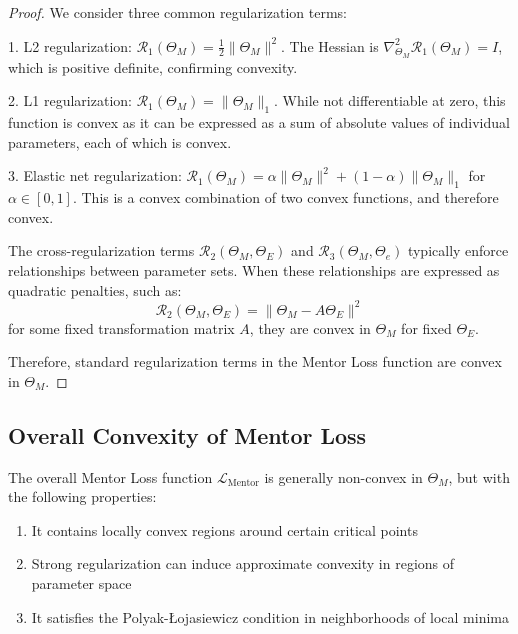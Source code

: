 \begin{proof}
We consider three common regularization terms:

1. L2 regularization: $\mathcal{R}_1(\Theta_M) = \frac{1}{2}\|\Theta_M\|^2$. The Hessian is $\nabla^2_{\Theta_M} \mathcal{R}_1(\Theta_M) = I$, which is positive definite, confirming convexity.

2. L1 regularization: $\mathcal{R}_1(\Theta_M) = \|\Theta_M\|_1$. While not differentiable at zero, this function is convex as it can be expressed as a sum of absolute values of individual parameters, each of which is convex.

3. Elastic net regularization: $\mathcal{R}_1(\Theta_M) = \alpha\|\Theta_M\|^2 + (1-\alpha)\|\Theta_M\|_1$ for $\alpha \in [0, 1]$. This is a convex combination of two convex functions, and therefore convex.

The cross-regularization terms $\mathcal{R}_2(\Theta_M, \Theta_E)$ and $\mathcal{R}_3(\Theta_M, \Theta_e)$ typically enforce relationships between parameter sets. When these relationships are expressed as quadratic penalties, such as:
\begin{equation}
\mathcal{R}_2(\Theta_M, \Theta_E) = \|\Theta_M - A\Theta_E\|^2
\end{equation}
for some fixed transformation matrix $A$, they are convex in $\Theta_M$ for fixed $\Theta_E$.

Therefore, standard regularization terms in the Mentor Loss function are convex in $\Theta_M$.
\end{proof}

\subsection{Overall Convexity of Mentor Loss}

\begin{theorem}
The overall Mentor Loss function $\mathcal{L}_{\text{Mentor}}$ is generally non-convex in $\Theta_M$, but with the following properties:
\begin{enumerate}
    \item It contains locally convex regions around certain critical points
    \item Strong regularization can induce approximate convexity in regions of parameter space
    \item It satisfies the Polyak-Łojasiewicz condition in neighborhoods of local minima
\end{enumerate}
\end{theorem}

